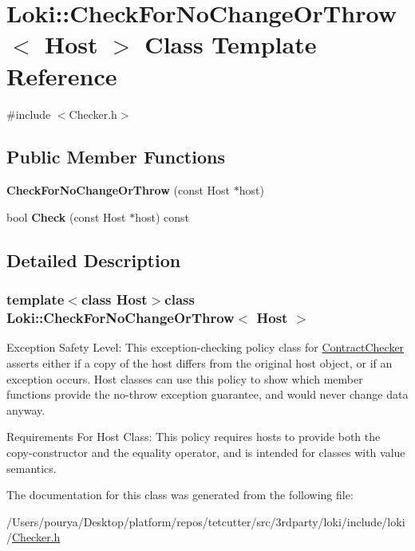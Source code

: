 \hypertarget{classLoki_1_1CheckForNoChangeOrThrow}{}\section{Loki\+:\+:Check\+For\+No\+Change\+Or\+Throw$<$ Host $>$ Class Template Reference}
\label{classLoki_1_1CheckForNoChangeOrThrow}


{\ttfamily \#include $<$Checker.\+h$>$}

\subsection*{Public Member Functions}
\begin{DoxyCompactItemize}
\item 
\hypertarget{classLoki_1_1CheckForNoChangeOrThrow_a50577f313edd95a618d5217f9b94aba2}{}{\bfseries Check\+For\+No\+Change\+Or\+Throw} (const Host $\ast$host)\label{classLoki_1_1CheckForNoChangeOrThrow_a50577f313edd95a618d5217f9b94aba2}

\item 
\hypertarget{classLoki_1_1CheckForNoChangeOrThrow_a7e5fc4434215125781b1639ab6ac669e}{}bool {\bfseries Check} (const Host $\ast$host) const \label{classLoki_1_1CheckForNoChangeOrThrow_a7e5fc4434215125781b1639ab6ac669e}

\end{DoxyCompactItemize}


\subsection{Detailed Description}
\subsubsection*{template$<$class Host$>$class Loki\+::\+Check\+For\+No\+Change\+Or\+Throw$<$ Host $>$}

\begin{DoxyParagraph}{Exception Safety Level\+:}
This exception-\/checking policy class for \hyperlink{classLoki_1_1ContractChecker}{Contract\+Checker} asserts either if a copy of the host differs from the original host object, or if an exception occurs. Host classes can use this policy to show which member functions provide the no-\/throw exception guarantee, and would never change data anyway.
\end{DoxyParagraph}
\begin{DoxyParagraph}{Requirements For Host Class\+:}
This policy requires hosts to provide both the copy-\/constructor and the equality operator, and is intended for classes with value semantics. 
\end{DoxyParagraph}


The documentation for this class was generated from the following file\+:\begin{DoxyCompactItemize}
\item 
/\+Users/pourya/\+Desktop/platform/repos/tetcutter/src/3rdparty/loki/include/loki/\hyperlink{Checker_8h}{Checker.\+h}\end{DoxyCompactItemize}
